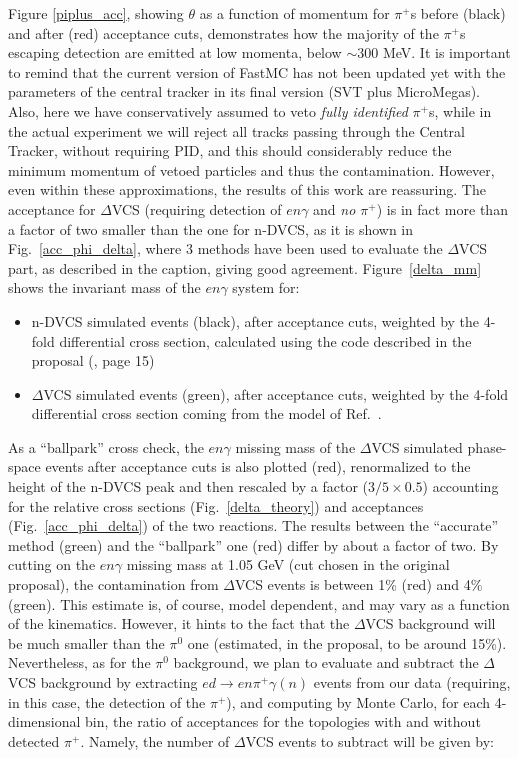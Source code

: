 \documentclass[12pt,oneside]{article}
\begin{document}
{Figure \ref{piplus_acc}, showing $\theta$ as a function of momentum for $\pi^+$s before (black) and after (red) acceptance cuts, demonstrates how the majority of the $\pi^+$s escaping detection are emitted at low momenta, below $\sim300$ MeV. It is important to remind that the current version of FastMC has not been updated yet with the parameters of the central tracker in its final version (SVT plus MicroMegas). Also, here we have conservatively assumed to veto {\it fully identified} $\pi^+$s, while in the actual experiment we will reject all tracks passing through the Central Tracker, without requiring PID, and this should considerably reduce the minimum momentum of vetoed particles and thus the contamination. However, even within these approximations, the results of this work are reassuring. The acceptance for $\Delta$VCS (requiring detection of $en\gamma$ and {\it no $\pi^+$}) is in fact more than a factor of two smaller than the one for n-DVCS, as it is shown in Fig.~\ref{acc_phi_delta}, where 3 methods have been used to evaluate the $\Delta$VCS part, as described in the caption, giving good agreement. Figure~\ref{delta_mm} shows the invariant mass of the $en\gamma$ system for:
\begin{itemize}
\item{n-DVCS simulated events (black), after acceptance cuts, weighted by the 4-fold differential cross section, calculated using the code \cite{ahmed} described in the proposal (\cite{proposal}, page 15)}
\item{$\Delta$VCS simulated events (green), after acceptance cuts, weighted by the 4-fold differential cross section coming from the model of Ref.~\cite{marc}.}
\end{itemize}
As a ``ballpark'' cross check, the $en\gamma$ missing mass of the $\Delta$VCS simulated phase-space events after acceptance cuts is also plotted (red), renormalized to the height of the n-DVCS peak and then rescaled by a factor ($3/5\times 0.5$) accounting for the relative cross sections (Fig.~\ref{delta_theory}) and acceptances (Fig.~\ref{acc_phi_delta}) of the two reactions. 
The results between the ``accurate'' method (green) and the ``ballpark'' one (red) differ by about a factor of two. By cutting on the $en\gamma$ missing mass at 1.05 GeV (cut chosen in the original proposal), the contamination from $\Delta$VCS events is between 1\% (red) and 4\% (green). This estimate is, of course, model dependent, and may vary as a function of the kinematics. However, it hints to the fact that the $\Delta$VCS background will be much smaller than the $\pi^0$ one (estimated, in the proposal, to be around 15\%). Nevertheless, as for the $\pi^0$ background, we plan to evaluate and subtract the $\Delta$VCS background by extracting $ed\to en\pi^+\gamma(n)$ events from our data (requiring, in this case, the detection of the $\pi^+$), and computing by Monte Carlo, for each 4-dimensional bin, the ratio of acceptances for the topologies with and without detected $\pi^+$. Namely, the number of $\Delta$VCS events to subtract will be given by:
}
\end{document}
